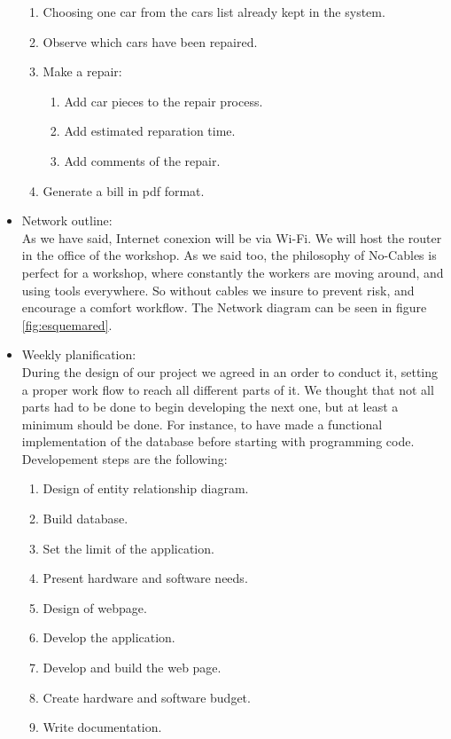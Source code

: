 \documentclass{article}
\begin{document}
\begin{itemize}
\begin{enumerate}
    \item Choosing one car from the cars list already kept in the system.
    \item Observe which cars have been repaired.
    \item Make a repair:
          \begin{enumerate}[label=\alph*]
            \item Add car pieces to the repair process.
            \item Add estimated reparation time.
            \item Add comments of the repair.
          \end{enumerate}
    \item Generate a bill in pdf format.
  \end{enumerate}
  \item Network outline:\\
  As we have said, Internet conexion will be via Wi-Fi. We will host the router in the office of the workshop. As we said too, the philosophy of No-Cables is perfect for a workshop, where constantly the workers are moving around, and using tools everywhere. So without cables we insure to prevent risk, and encourage a comfort workflow. The Network diagram can be seen in figure \ref{fig:esquemared}.
  \item Weekly planification:\\ 
  During the design of our project we agreed in an order to conduct it, setting a proper work flow to reach all different parts of it. We thought that not all parts had to be done to begin developing the next one, but at least a minimum should be done. For instance, to have made a functional implementation of the database before starting with programming code.
  Developement steps are the following:
  \begin{enumerate}
    \item Design of entity relationship diagram.
    \item Build database.
    \item Set the limit of the application.
    \item Present hardware and software needs.
    \item Design of webpage.
    \item Develop the application.
    \item Develop and build the web page.
    \item Create hardware and software budget.
    \item Write documentation.
  \end{enumerate}
\end{itemize}
\end{document}
